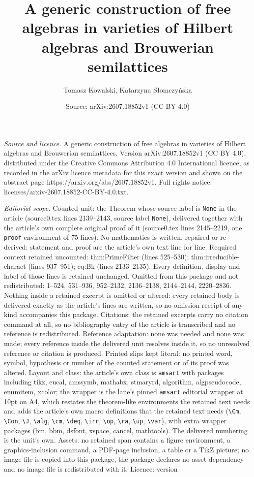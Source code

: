 \documentclass[10pt,a4paper]{amsart}
\title[A generic construction of free algebras in varieties of Hilb]{A generic construction of free algebras in varieties of Hilbert algebras and Brouwerian semilattices}
\author{Tomasz Kowalski, Katarzyna S{\l}omczy\'nska}
\date{Source: arXiv:2607.18852v1 (CC BY 4.0)}
\begin{document}
\maketitle

\noindent\emph{Source and licence.} A generic construction of free algebras in varieties of Hilbert algebras and Brouwerian semilattices. Version arXiv:2607.18852v1 (CC BY 4.0), distributed under the Creative Commons Attribution 4.0 International licence, as recorded in the arXiv licence metadata for this exact version and shown on the abstract page https://arxiv.org/abs/2607.18852v1. Full rights notice: licenses/arxiv-2607.18852-CC-BY-4.0.txt.\par\smallskip

\noindent\textit{Editorial scope.} Counted unit: the Theorem whose source label is \texttt{None} in the article (source0.tex lines 2139--2143, source label \texttt{None}), delivered together with the article's own complete original proof of it (source0.tex lines 2145--2219, one \texttt{proof} environment of 75 lines). No mathematics is written, repaired or re-derived: statement and proof are the article's own text line for line. Required context retained uncounted: thm:PrimeFilter (lines 525--530); thm:irreducible-charact (lines 937--951); eq:Bk (lines 2133--2135). Every definition, display and label of those lines is retained unchanged. Omitted from this package and not redistributed: 1--524, 531--936, 952--2132, 2136--2138, 2144--2144, 2220--2836. Nothing inside a retained excerpt is omitted or altered: every retained body is delivered exactly as the article's lines are written, so no omission receipt of any kind accompanies this package. Citations: the retained excerpts carry no citation command at all, so no bibliography entry of the article is transcribed and no reference is redistributed. Reference adaptation: none was needed and none was made; every reference inside the delivered unit resolves inside it, so no unresolved reference or citation is produced. Printed slips kept literal: no printed word, symbol, hypothesis or number of the counted statement or of its proof was altered. Layout and class: the article's own class is \texttt{amsart} with packages including tikz, eucal, amssymb, mathabx, stmaryrd, algorithm, algpseudocode, enumitem, xcolor; the wrapper is the lane's pinned \texttt{amsart} editorial wrapper at 10pt on A4, which restates the theorem-like environments the retained text needs and adds the article's own macro definitions that the retained text needs (\texttt{\textbackslash Cm}, \texttt{\textbackslash Con}, \texttt{\textbackslash J}, \texttt{\textbackslash alg}, \texttt{\textbackslash cm}, \texttt{\textbackslash deq}, \texttt{\textbackslash irr}, \texttt{\textbackslash op}, \texttt{\textbackslash ra}, \texttt{\textbackslash up}, \texttt{\textbackslash var}), with extra wrapper packages (bm, bbm, dsfont, xspace, cancel, mathtools). The delivered numbering is the unit's own. Assets: no retained span contains a figure environment, a graphics-inclusion command, a PDF-page inclusion, a table or a TikZ picture; no image file is copied into this package, the package declares no asset dependency and no image file is redistributed with it. Licence: version 
\end{document}
